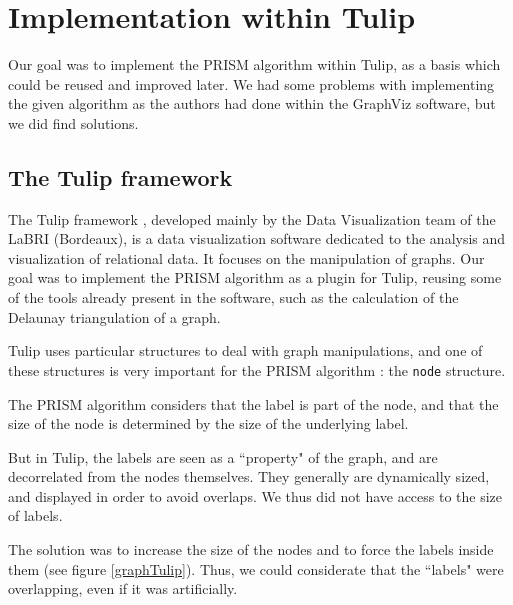 \documentclass[12pt]{report}
\begin{document}
\chapter{Implementation within Tulip}

Our goal was to implement the PRISM algorithm within Tulip, as a basis which could be reused and improved later. We had some problems with implementing the given algorithm as the authors had done within the GraphViz \cite{Gansner02} software, but we did find solutions.

\section{The Tulip framework}

The Tulip framework \cite{Auber12}, developed mainly by the Data Visualization team of the LaBRI (Bordeaux), is a data visualization software dedicated to the analysis and visualization of relational data. It focuses on the manipulation of graphs. Our goal was to implement the PRISM algorithm as a plugin for Tulip, reusing some of the tools already present in the software, such as the calculation of the Delaunay triangulation of a graph.

Tulip uses particular structures to deal with graph manipulations, and one of these structures is very important for the PRISM algorithm : the \texttt{node} structure.

The PRISM algorithm considers that the label is part of the node, and that the size of the node is determined by the size of the underlying label.

But in Tulip, the labels are seen as a ``property" of the graph, and are decorrelated from the nodes themselves. They generally are dynamically sized, and displayed in order to avoid overlaps. We thus did not have access to the size of labels.

The solution was to increase the size of the nodes and to force the labels inside them (see figure \ref{graphTulip}). Thus, we could considerate that the ``labels" were overlapping, even if it was artificially.
\end{document}
